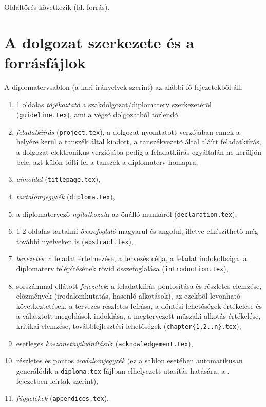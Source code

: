 Oldaltörés következik (ld. forrás).
\newpage

\section{A dolgozat szerkezete és a forrásfájlok}
A diplomatervsablon (a kari irányelvek szerint) az alábbi fõ fejezetekbõl áll:
\begin{enumerate}
	\item 1 oldalas \emph{tájékoztató} a szakdolgozat/diplomaterv szerkezetérõl (\verb+guideline.tex+), ami a végsõ dolgozatból törlendõ,
	\item \emph{feladatkiírás} (\verb+project.tex+), a dolgozat nyomtatott verzójában ennek a helyére kerül a tanszék által kiadott, a tanszékvezetõ által aláírt feladatkiírás, a dolgozat elektronikus verziójába pedig a feladatkiírás egyáltalán ne kerüljön bele, azt külön tölti fel a tanszék a diplomaterv-honlapra,
	\item \emph{címoldal} (\verb+titlepage.tex+),
	\item \emph{tartalomjegyzék} (\verb+diploma.tex+),
	\item a diplomatervezõ \emph{nyilatkozat}a az önálló munkáról (\verb+declaration.tex+),
	\item 1-2 oldalas tartalmi \emph{összefoglaló} magyarul és angolul, illetve elkészíthetõ még további nyelveken is (\verb+abstract.tex+),
	\item \emph{bevezetés}: a feladat értelmezése, a tervezés célja, a feladat indokoltsága, a diplomaterv felépítésének rövid összefoglalása (\verb+introduction.tex+),
	\item sorszámmal ellátott \emph{fejezetek}: a feladatkiírás pontosítása és részletes elemzése, elõzmények (irodalomkutatás, hasonló alkotások), az ezekbõl levonható következtetések, a tervezés részletes leírása, a döntési lehetõségek értékelése és a választott megoldások indoklása, a megtervezett mûszaki alkotás értékelése, kritikai elemzése, továbbfejlesztési lehetõségek (\verb+chapter{1,2..n}.tex+),
	\item esetleges \emph{köszönetnyilvánítás}ok (\verb+acknowledgement.tex+),
	\item részletes és pontos \emph{irodalomjegyzék} (ez a sablon esetében automatikusan generálódik a \verb+diploma.tex+ fájlban elhelyezett \verb++ utasítás hatására, a . fejezetben leírtak szerint),
	\item \emph{függelékek} (\verb+appendices.tex+).
\end{enumerate}

